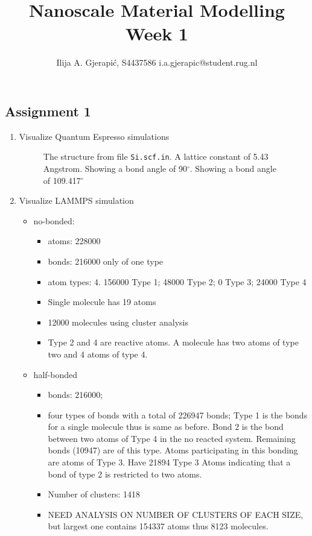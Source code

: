 \documentclass[10pt,a4paper,onecollum]{labreport}
\title{Nanoscale Material Modelling
\\
\normalsize{Week 1}} %
\author{Ilija A. Gjerapić, S4437586 i.a.gjerapic@student.rug.nl} %
\begin{document}
\twocolumn[
  \maketitle
  \begin{@twocolumnfalse}

  \end{@twocolumnfalse}
]


  

\thispagestyle{firststyle}

\begin{@twocolumnfalse}
\section*{Assignment 1}
\begin{enumerate}
  \item Visualize Quantum Espresso simulations
  \begin{figure}[h]
    \centering 
    \begin{subfigure}{0.33\textwidth}
      
    \end{subfigure}
    \caption{The structure from file \texttt{Si.scf.in}. A lattice constant of 5.43 Angstrom. Showing a bond angle of 90$^\circ$. Showing a bond angle of 109.417$^\circ$}
  \end{figure}

  \item Visualize LAMMPS simulation 
  \begin{itemize}
    \item no-bonded:
    \begin{itemize}
      \item atoms: 228000
      \item bonds: 216000 only of one type
      \item atom types: 4. 156000 Type 1; 48000 Type 2; 0 Type 3; 24000 Type 4
      \item Single molecule has 19 atoms
      \item 12000 molecules using cluster analysis
      \item Type 2 and 4 are reactive atoms. A molecule has two atoms of type two and 4 atoms of type 4.  
    \end{itemize}
    \item half-bonded
    \begin{itemize}
      \item bonds: 216000;
      \item four types of bonds with a total of 226947 bonds; Type 1 is the bonds for a single molecule thus is same as before. Bond 2 is the bond between two atoms of Type 4 in the no reacted system. Remaining bonds (10947) are of this type. Atoms participating in this bonding are atoms of Type 3. Have 21894 Type 3 Atoms indicating that a bond of type 2 is restricted to two atoms. 
      \item Number of clusters: 1418
      \item NEED ANALYSIS ON NUMBER OF CLUSTERS OF EACH SIZE, but largest one contains 154337 atoms thus 8123 molecules. 
    \end{itemize}



\end{itemize}
\end{enumerate}
\end{@twocolumnfalse}
\end{document}
